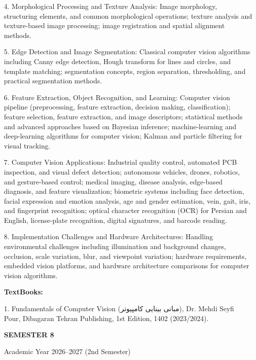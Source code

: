 \documentclass[12pt,a4paper]{article}
\begin{document}
4. Morphological Processing and Texture Analysis: Image morphology, structuring elements, and common morphological operations; texture analysis and texture-based image processing; image registration and spatial alignment methods.\par
5. Edge Detection and Image Segmentation: Classical computer vision algorithms including Canny edge detection, Hough transform for lines and circles, and template matching; segmentation concepts, region separation, thresholding, and practical segmentation methods.\par
6. Feature Extraction, Object Recognition, and Learning: Computer vision pipeline (preprocessing, feature extraction, decision making, classification); feature selection, feature extraction, and image descriptors; statistical methods and advanced approaches based on Bayesian inference; machine-learning and deep-learning algorithms for computer vision; Kalman and particle filtering for visual tracking.\par
7. Computer Vision Applications: Industrial quality control, automated PCB inspection, and visual defect detection; autonomous vehicles, drones, robotics, and gesture-based control; medical imaging, disease analysis, edge-based diagnosis, and feature visualization; biometric systems including face detection, facial expression and emotion analysis, age and gender estimation, vein, gait, iris, and fingerprint recognition; optical character recognition (OCR) for Persian and English, license-plate recognition, digital signatures, and barcode reading.\par
8. Implementation Challenges and Hardware Architectures: Handling environmental challenges including illumination and background changes, occlusion, scale variation, blur, and viewpoint variation; hardware requirements, embedded vision platforms, and hardware architecture comparisons for computer vision algorithms.\par\vspace{4pt}
\textbf{TextBooks:}\par\vspace{2pt}
1. Fundamentals of Computer Vision (مبانی بینایی کامپیوتر), Dr. Mehdi Seyfi Pour, Dibagaran Tehran Publishing, 1st Edition, 1402 (2023/2024).\par
\vspace{4pt}

\newpage
\vspace*{\fill}
\begin{center}
  {\fontsize{28pt}{34pt}\selectfont \textbf{SEMESTER 8}}\par\vspace{12pt}
  {\fontsize{13pt}{17pt}\selectfont Academic Year 2026–2027 (2nd Semester)}
\end{center}
\vspace*{\fill}
\end{document}
